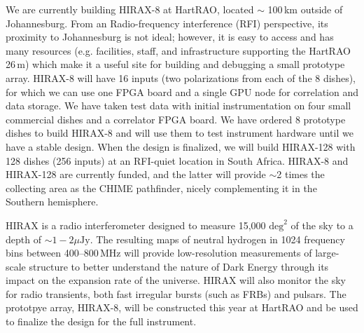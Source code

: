 \documentclass[]{spie}  %
\begin{document}
We are currently building HIRAX-8 at HartRAO, located $\sim$ 100\,km outside of Johannesburg. From an Radio-frequency interference (RFI) perspective, its proximity to Johannesburg is not ideal; however, it is easy to access and has many resources (e.g. facilities, staff, and infrastructure supporting the HartRAO 26\,m) which make it a useful site for building and debugging a small prototype array. HIRAX-8 will have 16 inputs (two polarizations from each of the 8 dishes), for which we can use one FPGA board and a single GPU node for correlation and data storage. We have taken test data with initial instrumentation on four small commercial dishes and a correlator FPGA board. We have ordered 8 prototype dishes to build HIRAX-8 and will use them to test instrument hardware until we have a stable design. When the design is finalized, we will build HIRAX-128 with 128 dishes (256 inputs) at an RFI-quiet location in South Africa. HIRAX-8 and HIRAX-128 are currently funded, and the latter will provide $\sim$2 times the collecting area as the CHIME pathfinder, nicely complementing it in the Southern hemisphere. 

HIRAX is a radio interferometer designed to measure 15,000 $\mathrm{deg}^{2}$ of the sky to a depth of $\sim1-2\mu\mathrm{Jy}$. The resulting maps of neutral hydrogen in 1024 frequency bins between 400--800\,MHz will provide low-resolution measurements of large-scale structure to better understand the nature of Dark Energy through its impact on the expansion rate of the universe. HIRAX will also monitor the sky for radio transients, both fast irregular bursts (such as FRBs) and pulsars. The prototpye array, HIRAX-8, will be constructed this year at HartRAO and be used to finalize the design for the full instrument.

\label{sec:conc}



   
\end{document}

